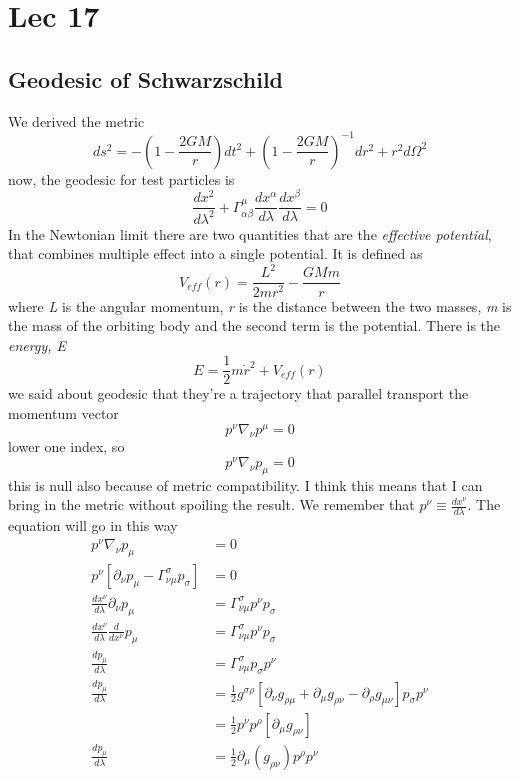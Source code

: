 \section{Lec 17}
\subsection{Geodesic of Schwarzschild}
We derived the metric 
\[
ds^{2} = - \left( 1- \frac{2GM}{r} \right)dt^{2} + \left( 1- \frac{2GM}{r} \right)^{-1}dr^{2} + r^{2} d\Omega ^{2}
\]
now, the geodesic for test particles is
\[
\frac{d x^{2}}{d \lambda ^{2}} + \Gamma ^{\mu }_{\alpha \beta } \frac{d x^{\alpha }}{d \lambda }\frac{d x^{\beta }}{d \lambda } = 0
\]
In the Newtonian limit there are two quantities that are the \emph{effective potential}, that combines multiple effect into a single potential. It is defined as
\[
V_{eff}\left( r \right) = \frac{L^{2}}{2mr^{2}} - \frac{GMm}{r}
\]
where \emph{L} is the angular momentum, \emph{r} is the distance between the two masses, \emph{m} is the mass of the orbiting body and the second term is the potential.
There is the \emph{energy, E}
\[
	E = \frac{1}{2}m\dot{r}^{2} + V_{eff}\left( r \right)
\]
we said about geodesic that they're a trajectory that parallel transport  the momentum vector
\[
p^{\nu }\nabla _{\nu }p^{\mu } = 0
\]
lower one index, so
\[
p^{\nu }\nabla _{\nu }p_{\mu } = 0
\]
this is null also because of metric compatibility. I think this means that I can bring in the metric without spoiling the result. We remember that $p^{\nu } \equiv \frac{d x^{\nu }}{d \lambda }$.
The equation will go in this way
\begin{align}
	p^{\nu }\nabla _{\nu }p_{\mu } &= 0 \\
	p^{\nu }\left[ \partial_{\nu }p_{\mu } - \Gamma ^{\sigma }_{\nu \mu }p_{\sigma } \right] & = 0 \\
	\frac{d x^{\nu }}{d \lambda } \partial_{\nu }p_{\mu } &= \Gamma ^{\sigma }_{\nu \mu }p^{\nu }p_{\sigma } \\
	\frac{d x^{\nu }}{d \lambda }\frac{d }{d x^{ \nu }}p_{\mu } & = \Gamma ^{\sigma }_{\nu \mu }p^{\nu }p_{\sigma } \\
	\frac{d p_{\mu }}{d \lambda } &= \Gamma ^{\sigma }_{\nu \mu } p_{\sigma }p^{\nu }\\
	\frac{d p_{\mu }}{d \lambda } &= \frac{1}{2}g^{\sigma \rho } \left[ \partial_{\nu }g_{\rho \mu } + \partial_{\mu }g_{\rho \nu } - \partial_{\rho }g_{\mu \nu } \right] p_{\sigma }p^{\nu } \\
				      &= \frac{1}{2} p^{\nu }p^{\rho } \left[ \partial_{\mu }g_{\rho \nu } \right] \\
				     \frac{d p_{\mu }}{d \lambda } &= \frac{1}{2} \partial_{\mu }\left( g_{\rho \nu } \right) p^{\rho }p^{\nu } \\
\end{align}

